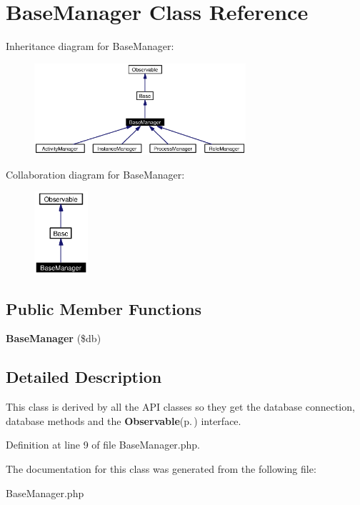 \section{Base\-Manager Class Reference}
\label{classBaseManager}
Inheritance diagram for Base\-Manager:\begin{figure}[H]
\begin{center}
\leavevmode
\includegraphics[width=222pt]{classBaseManager__inherit__graph}
\end{center}
\end{figure}
Collaboration diagram for Base\-Manager:\begin{figure}[H]
\begin{center}
\leavevmode
\includegraphics[width=56pt]{classBaseManager__coll__graph}
\end{center}
\end{figure}
\subsection*{Public Member Functions}
\begin{CompactItemize}
\item 
{\bf Base\-Manager} (\$db)\label{classBaseManager_a0}

\end{CompactItemize}


\subsection{Detailed Description}
This class is derived by all the API classes so they get the database connection, database methods and the {\bf Observable}{\rm (p.\,\pageref{classObservable})} interface. 



Definition at line 9 of file Base\-Manager.php.

The documentation for this class was generated from the following file:\begin{CompactItemize}
\item 
Base\-Manager.php\end{CompactItemize}
